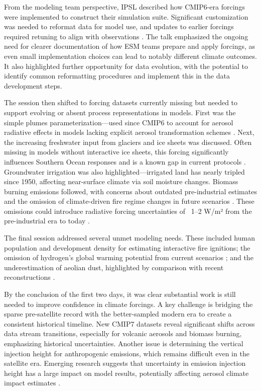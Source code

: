 \documentclass{ametsocV6.1}
\begin{document}
From the modeling team perspective, IPSL described how CMIP6-era forcings were implemented to construct their simulation suite. Significant customization was needed to reformat data for model use, and updates to earlier forcings required retuning to align with observations \citep{lurton_implementation_2020}. The talk emphasized the ongoing need for clearer documentation of how ESM teams prepare and apply forcings, as even small implementation choices can lead to notably different climate outcomes. It also highlighted further opportunity for data evolution, with the potential to identify common reformatting procedures and implement this in the data development steps. 

The session then shifted to forcing datasets currently missing but needed to support evolving or absent process representations in models. First was the simple plumes parameterization—used since CMIP6 to account for aerosol radiative effects in models lacking explicit aerosol transformation schemes \citep[e.g.,][]{stevens_macv2-sp_2017,fiedler_anthropogenic_2019}. Next, the increasing freshwater input from glaciers and ice sheets was discussed. Often missing in models without interactive ice sheets, this forcing significantly influences Southern Ocean responses and is a known gap in current protocols \citep[e.g.,][]{roach_winds_2023,schmidt_anomalous_2023}. Groundwater irrigation was also highlighted—irrigated land has nearly tripled since 1950, affecting near-surface climate via soil moisture changes. Biomass burning emissions followed, with concerns about outdated pre-industrial estimates and the omission of climate-driven fire regime changes in future scenarios \citep[e.g.,][]{chen_multi-decadal_2023,hamilton_global_2024}. These omissions could introduce radiative forcing uncertainties of ~1–2 W/m² from the pre-industrial era to today \citep{hamilton_reassessment_2018,wan_importance_2021}.

The final session addressed several unmet modeling needs. These included human population and development density for estimating interactive fire ignitions; the omission of hydrogen’s global warming potential from current scenarios \citep[e.g.,][]{sand_multi-model_2023}; and the underestimation of aeolian dust, highlighted by comparison with recent reconstructions \citep[e.g.,][]{kok_mineral_2023}.

By the conclusion of the first two days, it was clear substantial work is still needed to improve confidence in climate forcings. A key challenge is bridging the sparse pre-satellite record with the better-sampled modern era to create a consistent historical timeline. New CMIP7 datasets reveal significant shifts across data stream transitions, especially for volcanic aerosols and biomass burning, emphasizing historical uncertainties. Another issue is determining the vertical injection height for anthropogenic emissions, which remains difficult even in the satellite era. Emerging research suggests that uncertainty in emission injection height has a large impact on model results, potentially affecting aerosol climate impact estimates \citep[e.g.,][]{ahsan_emissions_2023}.
\end{document}
